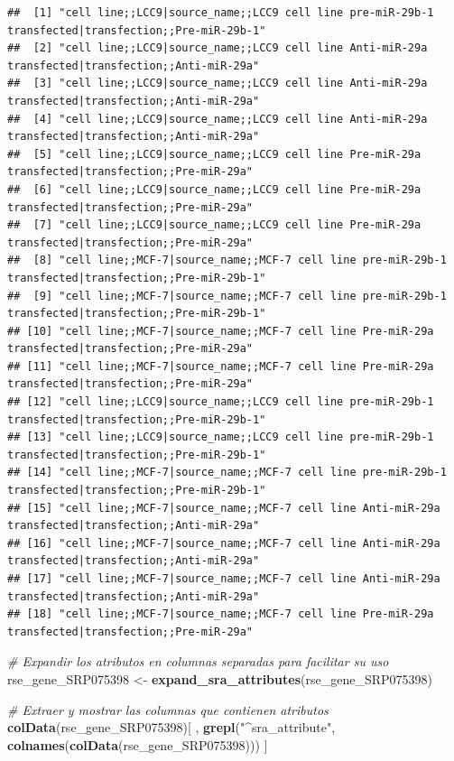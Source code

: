 \documentclass[
]{article}
\newenvironment{Shaded}{\begin{snugshade}}{\end{snugshade}}
\newcommand{\CommentTok}[1]{\textcolor[rgb]{0.56,0.35,0.01}{\textit{#1}}}
\newcommand{\FunctionTok}[1]{\textcolor[rgb]{0.13,0.29,0.53}{\textbf{#1}}}
\newcommand{\NormalTok}[1]{#1}
\newcommand{\OtherTok}[1]{\textcolor[rgb]{0.56,0.35,0.01}{#1}}
\newcommand{\StringTok}[1]{\textcolor[rgb]{0.31,0.60,0.02}{#1}}
\begin{document}
\begin{verbatim}
##  [1] "cell line;;LCC9|source_name;;LCC9 cell line pre-miR-29b-1 transfected|transfection;;Pre-miR-29b-1"  
##  [2] "cell line;;LCC9|source_name;;LCC9 cell line Anti-miR-29a transfected|transfection;;Anti-miR-29a"    
##  [3] "cell line;;LCC9|source_name;;LCC9 cell line Anti-miR-29a transfected|transfection;;Anti-miR-29a"    
##  [4] "cell line;;LCC9|source_name;;LCC9 cell line Anti-miR-29a transfected|transfection;;Anti-miR-29a"    
##  [5] "cell line;;LCC9|source_name;;LCC9 cell line Pre-miR-29a transfected|transfection;;Pre-miR-29a"      
##  [6] "cell line;;LCC9|source_name;;LCC9 cell line Pre-miR-29a transfected|transfection;;Pre-miR-29a"      
##  [7] "cell line;;LCC9|source_name;;LCC9 cell line Pre-miR-29a transfected|transfection;;Pre-miR-29a"      
##  [8] "cell line;;MCF-7|source_name;;MCF-7 cell line pre-miR-29b-1 transfected|transfection;;Pre-miR-29b-1"
##  [9] "cell line;;MCF-7|source_name;;MCF-7 cell line pre-miR-29b-1 transfected|transfection;;Pre-miR-29b-1"
## [10] "cell line;;MCF-7|source_name;;MCF-7 cell line Pre-miR-29a transfected|transfection;;Pre-miR-29a"    
## [11] "cell line;;MCF-7|source_name;;MCF-7 cell line Pre-miR-29a transfected|transfection;;Pre-miR-29a"    
## [12] "cell line;;LCC9|source_name;;LCC9 cell line pre-miR-29b-1 transfected|transfection;;Pre-miR-29b-1"  
## [13] "cell line;;LCC9|source_name;;LCC9 cell line pre-miR-29b-1 transfected|transfection;;Pre-miR-29b-1"  
## [14] "cell line;;MCF-7|source_name;;MCF-7 cell line pre-miR-29b-1 transfected|transfection;;Pre-miR-29b-1"
## [15] "cell line;;MCF-7|source_name;;MCF-7 cell line Anti-miR-29a transfected|transfection;;Anti-miR-29a"  
## [16] "cell line;;MCF-7|source_name;;MCF-7 cell line Anti-miR-29a transfected|transfection;;Anti-miR-29a"  
## [17] "cell line;;MCF-7|source_name;;MCF-7 cell line Anti-miR-29a transfected|transfection;;Anti-miR-29a"  
## [18] "cell line;;MCF-7|source_name;;MCF-7 cell line Pre-miR-29a transfected|transfection;;Pre-miR-29a"
\end{verbatim}

\begin{Shaded}
\begin{Highlighting}[]
\CommentTok{\# Expandir los atributos en columnas separadas para facilitar su uso}
\NormalTok{rse\_gene\_SRP075398 }\OtherTok{\textless{}{-}} \FunctionTok{expand\_sra\_attributes}\NormalTok{(rse\_gene\_SRP075398)}

\CommentTok{\# Extraer y mostrar las columnas que contienen atributos }
\FunctionTok{colData}\NormalTok{(rse\_gene\_SRP075398)[}
\NormalTok{  ,}
  \FunctionTok{grepl}\NormalTok{(}\StringTok{"\^{}sra\_attribute"}\NormalTok{, }\FunctionTok{colnames}\NormalTok{(}\FunctionTok{colData}\NormalTok{(rse\_gene\_SRP075398)))}
\NormalTok{]}
\end{Highlighting}
\end{Shaded}
\end{document}
